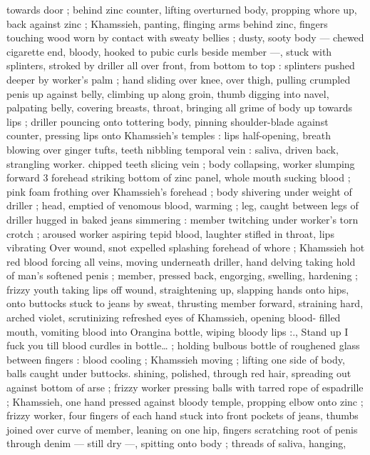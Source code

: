 towards door ; behind zinc counter, lifting overturned body, propping 
whore up, back against zinc ; Khamssieh, panting, flinging arms 
behind zinc, fingers touching wood worn by contact with sweaty 
bellies ; dusty, sooty body --- chewed cigarette end, bloody, hooked 
to pubic curls beside member ---, stuck with splinters, stroked by 
driller all over front, from bottom to top : splinters pushed deeper by 
worker's palm ; hand sliding over knee, over thigh, pulling crumpled 
penis up against belly, climbing up along groin, thumb digging into 
navel, palpating belly, covering breasts, throat, bringing all grime of 
body up towards lips ; driller pouncing onto tottering body, pinning 
shoulder-blade against counter, pressing lips onto Khamssieh's 
temples : lips half-opening, breath blowing over ginger tufts, teeth 
nibbling temporal vein : saliva, driven back, strangling worker. 
chipped teeth slicing vein ; body collapsing, worker slumping forward 
3 forehead striking bottom of zinc panel, whole mouth sucking blood 
; pink foam frothing over Khamssieh's forehead ; body shivering 
under weight of driller ; head, emptied of venomous blood, warming 
; leg, caught between legs of driller hugged in baked jeans 
simmering : member twitching under worker's torn crotch ; aroused 
worker aspiring tepid blood, laughter stifled in throat, lips vibrating 
Over wound, snot expelled splashing forehead of whore ; Khamssieh 
hot red blood forcing all veins, moving underneath driller, hand 
delving taking hold of man's softened penis ; member, pressed back, 
engorging, swelling, hardening ; frizzy youth taking lips off wound, 
straightening up, slapping hands onto hips, onto buttocks stuck to 
jeans by sweat, thrusting member forward, straining hard, arched 
violet, scrutinizing refreshed eyes of Khamssieh, opening blood- 
filled mouth, vomiting blood into Orangina bottle, wiping bloody lips 
:{\gl}., Stand up{\td} I fuck you till blood curdles in bottle{\ldots} ; holding 
bulbous bottle of roughened glass between fingers : blood cooling ; 
Khamssieh moving ; lifting one side of body, balls caught under 
buttocks. shining, polished, through red hair, spreading out against 
bottom of arse ; frizzy worker pressing balls with tarred rope of 
espadrille ; Khamssieh, one hand pressed against bloody temple, 
propping elbow onto zinc ; frizzy worker, four fingers of each hand 
stuck into front pockets of jeans, thumbs joined over curve of 
member, leaning on one hip, fingers scratching root of penis through 
denim --- still dry ---, spitting onto body ; threads of saliva, hanging, 
